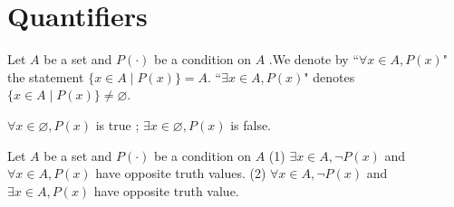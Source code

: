 \section{Quantifiers}
\begin{definitionenv}\label{2.4.1}
    Let $A$ be a set and $P(\cdot)$ be a condition on $A$ .We denote by 
    \newline
    ``$\forall x\in A,  P(x)$" the statement $\{x\in A\mid P(x)\}=A$.
    \newline
    ``$\exists x\in A, P(x)$" denotes$\{x\in A\mid P(x)\}\neq \varnothing$.
\end{definitionenv}
\begin{exampleenv}
    $\forall x\in \varnothing , P(x)$ is true ; $\exists x\in \varnothing, P(x)$ is false.
\end{exampleenv}
\begin{theoremenv}\label{theorem2.4.1}
    Let $A$ be a set and $P(\cdot)$ be a condition on $A$
    \newline
    (1) $\exists x\in A, \neg P(x) $ and $ \forall x\in A, P(x)$ have opposite truth values.
    \newline
    (2) $\forall x\in A, \neg P(x)$ and $\exists x\in A, P(x)$ have opposite truth value.
\end{theoremenv}



